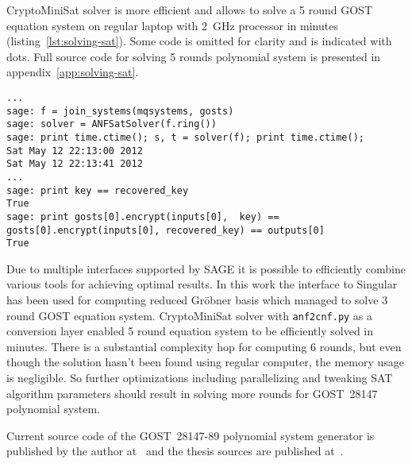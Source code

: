 \mbox{CryptoMiniSat} solver is more efficient and allows to solve a 5 round GOST equation system on regular laptop with
2~GHz processor in minutes (listing~\ref{lst:solving-sat}). Some code is
omitted for clarity and is indicated with dots. Full source
code for solving 5 rounds polynomial system is presented in
appendix~\ref{app:solving-sat}. 
\begin{lstlisting}[label=lst:solving-sat, caption=Solving 5 round GOST system using SAT solver]
...
sage: f = join_systems(mqsystems, gosts)
sage: solver = ANFSatSolver(f.ring())
sage: print time.ctime(); s, t = solver(f); print time.ctime();
Sat May 12 22:13:00 2012
Sat May 12 22:13:41 2012
...
sage: print key == recovered_key                                                                             
True
sage: print gosts[0].encrypt(inputs[0],  key) == gosts[0].encrypt(inputs[0], recovered_key) == outputs[0]    
True
\end{lstlisting}

Due to multiple interfaces supported by SAGE it is possible to efficiently
combine various tools for achieving optimal results. In this work the interface
to Singular has been used for computing reduced Gr\"obner basis which managed
to solve 3 round GOST equation system.
\mbox{CryptoMiniSat} solver with \verb+anf2cnf.py+ as a conversion layer
enabled 5 round equation system to be efficiently solved in minutes. There is a
substantial complexity hop for computing 6 rounds, but even though the solution
hasn't been found using regular computer, the memory usage is negligible. So
further optimizations including parallelizing and tweaking SAT algorithm
parameters should result in solving more rounds for GOST~28147 polynomial
system.

Current source code of the GOST~28147-89 polynomial system generator is
published by the author at~\cite{zoresvit:repo-algebraic} and the thesis sources are
published at~\cite{zoresvit:thesis}.

